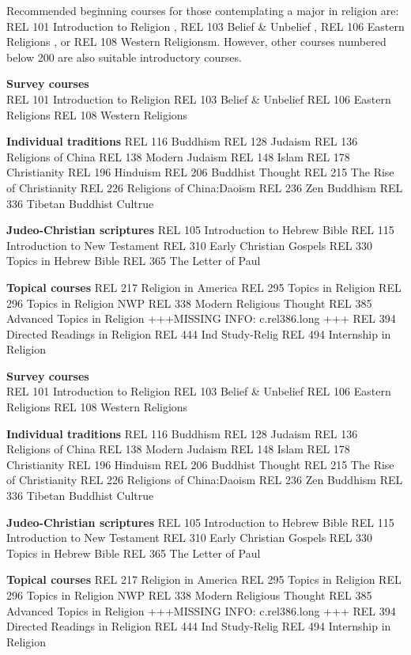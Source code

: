 \documentclass[
  letterpaper,
]{scrbook}
\begin{document}
Recommended beginning courses for those contemplating a major in
religion are: REL 101 Introduction to Religion , REL 103 Belief \&
Unbelief , REL 106 Eastern Religions , or REL 108 Western Religionsm.
However, other courses numbered below 200 are also suitable introductory
courses.

\textbf{Survey courses}\\
REL 101 Introduction to Religion REL 103 Belief \& Unbelief REL 106
Eastern Religions REL 108 Western Religions

\textbf{Individual traditions} REL 116 Buddhism REL 128 Judaism REL 136
Religions of China REL 138 Modern Judaism REL 148 Islam REL 178
Christianity REL 196 Hinduism REL 206 Buddhist Thought REL 215 The Rise
of Christianity REL 226 Religions of China:Daoism REL 236 Zen Buddhism
REL 336 Tibetan Buddhist Cultrue

\textbf{Judeo-Christian scriptures} REL 105 Introduction to Hebrew Bible
REL 115 Introduction to New Testament REL 310 Early Christian Gospels
REL 330 Topics in Hebrew Bible REL 365 The Letter of Paul

\textbf{Topical courses} REL 217 Religion in America REL 295 Topics in
Religion REL 296 Topics in Religion NWP REL 338 Modern Religious Thought
REL 385 Advanced Topics in Religion +++MISSING INFO: c.rel386.long +++
REL 394 Directed Readings in Religion REL 444 Ind Study-Relig REL 494
Internship in Religion

\textbf{Survey courses}\\
REL 101 Introduction to Religion REL 103 Belief \& Unbelief REL 106
Eastern Religions REL 108 Western Religions

\textbf{Individual traditions} REL 116 Buddhism REL 128 Judaism REL 136
Religions of China REL 138 Modern Judaism REL 148 Islam REL 178
Christianity REL 196 Hinduism REL 206 Buddhist Thought REL 215 The Rise
of Christianity REL 226 Religions of China:Daoism REL 236 Zen Buddhism
REL 336 Tibetan Buddhist Cultrue

\textbf{Judeo-Christian scriptures} REL 105 Introduction to Hebrew Bible
REL 115 Introduction to New Testament REL 310 Early Christian Gospels
REL 330 Topics in Hebrew Bible REL 365 The Letter of Paul

\textbf{Topical courses} REL 217 Religion in America REL 295 Topics in
Religion REL 296 Topics in Religion NWP REL 338 Modern Religious Thought
REL 385 Advanced Topics in Religion +++MISSING INFO: c.rel386.long +++
REL 394 Directed Readings in Religion REL 444 Ind Study-Relig REL 494
Internship in Religion
\end{document}
